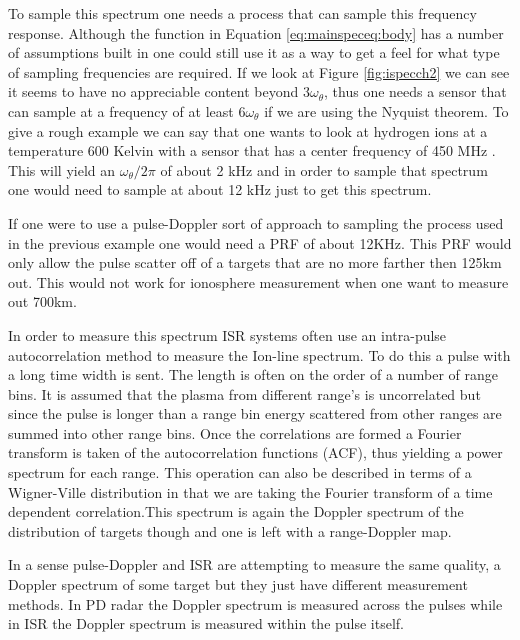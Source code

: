To sample this spectrum one needs a process that can sample this frequency response.  Although the function in Equation \ref{eq:mainspeceq:body} has a number of assumptions built in one could still use it as a way to get a feel for what type of sampling frequencies are required.  If we look at Figure \ref{fig:ispecch2} we can see it seems to have no appreciable content beyond $3\omega_\theta$, thus one needs a sensor that can sample at a frequency of at least $6\omega_\theta$ if we are using the Nyquist theorem.  To give a rough example we can say that one wants to look at hydrogen ions at a  temperature 600 Kelvin with a sensor that has a center frequency of 450 MHz \footnotemark[1].  This will yield an $\omega_\theta/2\pi$ of about 2 kHz and in order to sample that spectrum one would need to sample at about 12 kHz just to get this spectrum.
  

If one were to use a pulse-Doppler sort of approach to sampling the process used in the previous example one would need a PRF of about 12KHz.  This PRF would only allow the pulse scatter off of a targets that are no more farther then 125km out.  This would not work for ionosphere measurement when one want to measure out 700km. 

In order to measure this spectrum ISR systems often use an intra-pulse autocorrelation method to measure the Ion-line spectrum.  To do this a pulse with a long time width is sent.  The length is often on the order of a number of range bins.  It is assumed that the plasma from different range's is uncorrelated but since the pulse is longer than a range bin energy scattered from other ranges are summed into other range bins.  Once the correlations are formed a Fourier transform is taken of the autocorrelation functions (ACF), thus yielding a power spectrum for each range.  This operation can also be described in terms of a Wigner-Ville distribution in that we are taking the Fourier transform of a time dependent correlation.\footnotemark[2] This spectrum is again the Doppler spectrum of the distribution of targets though and one is left with a range-Doppler map.

In a sense pulse-Doppler and ISR are attempting to measure the same quality, a Doppler spectrum of some target but they just have different measurement methods.  In PD radar the Doppler spectrum is measured across the pulses while in ISR the Doppler spectrum is measured within the pulse itself.  

